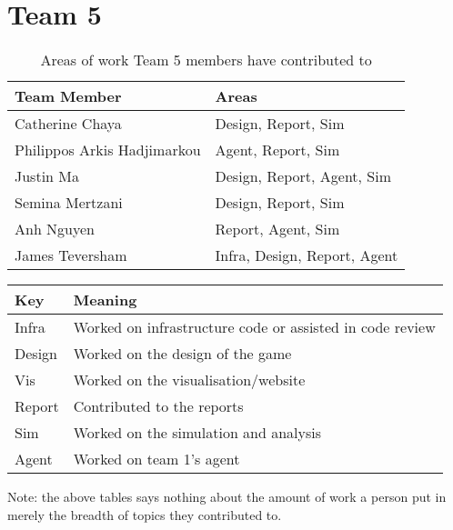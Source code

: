\section{Team 5}
\label{sec:roles_appendix:team5}

\begin{table}[!h]
    \centering
    \begin{tabular}{|l|l|}
    \hline
    \textbf{Team Member} & \textbf{Areas}     \\ \hline
    Catherine Chaya  & Design, Report, Sim         \\
    Philippos Arkis Hadjimarkou  & Agent, Report, Sim                 \\
    Justin Ma     & Design, Report, Agent, Sim        \\
    Semina Mertzani     & Design, Report, Sim \\
    Anh Nguyen    & Report, Agent, Sim                      \\
    James Teversham  & Infra, Design, Report, Agent                        \\
\end{tabular}
\caption{Areas of work Team 5 members have contributed to}
\label{sec:roles_appendix:team1}
\end{table}

\begin{table}[!h]
    \centering
    \begin{tabular}{|l|l|}
    \hline
    \textbf{Key}    & \textbf{Meaning}                               \\ \hline
    Infra  & Worked on infrastructure code or assisted in code review \\
    Design & Worked on the design of the game                         \\
    Vis    & Worked on the visualisation/website                      \\
    Report & Contributed to the reports                               \\
    Sim    & Worked on the simulation and analysis                    \\
    Agent  & Worked on team 1's agent                                 \\ \hline
    \end{tabular}
    \end{table}

Note: the above tables says nothing about the amount of work a person put in merely the breadth of topics they contributed to.

